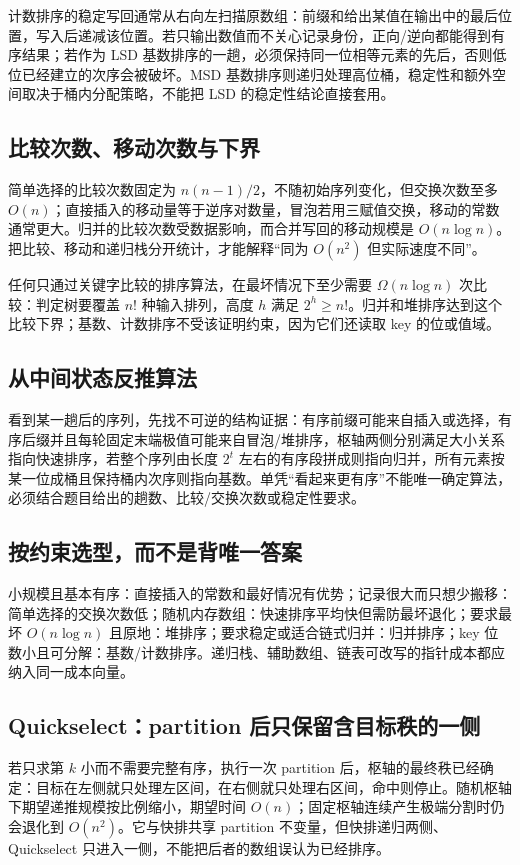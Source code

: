 \documentclass[UTF8,fontset=none,11pt,a4paper]{ctexart}
\begin{document}
计数排序的稳定写回通常从右向左扫描原数组：前缀和给出某值在输出中的最后位置，写入后递减该位置。若只输出数值而不关心记录身份，正向/逆向都能得到有序结果；若作为 LSD 基数排序的一趟，必须保持同一位相等元素的先后，否则低位已经建立的次序会被破坏。MSD 基数排序则递归处理高位桶，稳定性和额外空间取决于桶内分配策略，不能把 LSD 的稳定性结论直接套用。

\subsection{比较次数、移动次数与下界}
简单选择的比较次数固定为 $n(n-1)/2$，不随初始序列变化，但交换次数至多 $O(n)$；直接插入的移动量等于逆序对数量，冒泡若用三赋值交换，移动的常数通常更大。归并的比较次数受数据影响，而合并写回的移动规模是 $O(n\log n)$。把比较、移动和递归栈分开统计，才能解释“同为 $O(n^2)$ 但实际速度不同”。

任何只通过关键字比较的排序算法，在最坏情况下至少需要 $\Omega(n\log n)$ 次比较：判定树要覆盖 $n!$ 种输入排列，高度 $h$ 满足 $2^h\ge n!$。归并和堆排序达到这个比较下界；基数、计数排序不受该证明约束，因为它们还读取 key 的位或值域。

\subsection{从中间状态反推算法}
看到某一趟后的序列，先找不可逆的结构证据：有序前缀可能来自插入或选择，有序后缀并且每轮固定末端极值可能来自冒泡/堆排序，枢轴两侧分别满足大小关系指向快速排序，若整个序列由长度 $2^t$ 左右的有序段拼成则指向归并，所有元素按某一位成桶且保持桶内次序则指向基数。单凭“看起来更有序”不能唯一确定算法，必须结合题目给出的趟数、比较/交换次数或稳定性要求。

\subsection{按约束选型，而不是背唯一答案}
小规模且基本有序：直接插入的常数和最好情况有优势；记录很大而只想少搬移：简单选择的交换次数低；随机内存数组：快速排序平均快但需防最坏退化；要求最坏 $O(n\log n)$ 且原地：堆排序；要求稳定或适合链式归并：归并排序；key 位数小且可分解：基数/计数排序。递归栈、辅助数组、链表可改写的指针成本都应纳入同一成本向量。

\subsection{Quickselect：partition 后只保留含目标秩的一侧}
若只求第 $k$ 小而不需要完整有序，执行一次 partition 后，枢轴的最终秩已经确定：目标在左侧就只处理左区间，在右侧就只处理右区间，命中则停止。随机枢轴下期望递推规模按比例缩小，期望时间 $O(n)$；固定枢轴连续产生极端分割时仍会退化到 $O(n^2)$。它与快排共享 partition 不变量，但快排递归两侧、Quickselect 只进入一侧，不能把后者的数组误认为已经排序。
\end{document}
